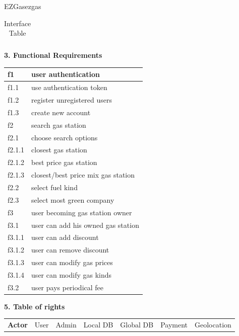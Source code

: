 \documentclass[12pt]{article}
\begin{document}
\begin{example}{EZGas}{ezgas}
\begin{table}[H]
\begin{tabular}{|c|c|c|}
      \hline
    \end{tabular}
    \caption{Interface Table}
  \end{table}
  \textbf{3. Functional Requirements}
  \begin{table}[H]
    \centering
    \begin{tabular}{|l|l|}
      \hline
      f1 & user authentication \\
      \hline
      f1.1 & use authentication token \\
      \hline
      f1.2 & register unregistered users \\
      \hline
      f1.3 & create new account \\
      \hline

      f2 & search gas station \\
      \hline
      f2.1 & choose search options \\
      \hline
      f2.1.1 & closest gas station \\
      \hline
      f2.1.2 & best price gas station \\
      \hline
      f2.1.3 & closest/best price mix gas station \\
      \hline
      f2.2 & select fuel kind \\
      \hline
      f2.3 & select most green company \\
      \hline

      f3 & user becoming gas station owner \\
      \hline
      f3.1 & user can add his owned gas station \\
      \hline
      f3.1.1 & user can add discount \\
      \hline
      f3.1.2 & user can remove discount \\
      \hline
      f3.1.3 & user can modify gas prices \\
      \hline
      f3.1.4 & user can modify gas kinds \\
      \hline
      f3.2 & user pays periodical fee \\
      \hline
    \end{tabular}
  \end{table}
  \textbf{5. Table of rights}
  \begin{table}[H]
    \centering
    \begin{tabular}{|l|l|l|l|l|l|l|}
      \textbf{Actor} & User & Admin & Local DB & Global DB & Payment & Geolocation

    \end{tabular}
  \end{table}
\end{example}
\end{document}
